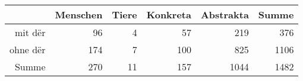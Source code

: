 \begin{tabular}{rrrrrr}
  \hline
 & Menschen & Tiere & Konkreta & Abstrakta & Summe \\ 
  \hline
mit dër & 96 & 4 & 57 & 219 & 376 \\ 
  ohne dër & 174 & 7 & 100 & 825 & 1106 \\ 
  Summe & 270 & 11 & 157 & 1044 & 1482 \\ 
   \hline
\end{tabular}
